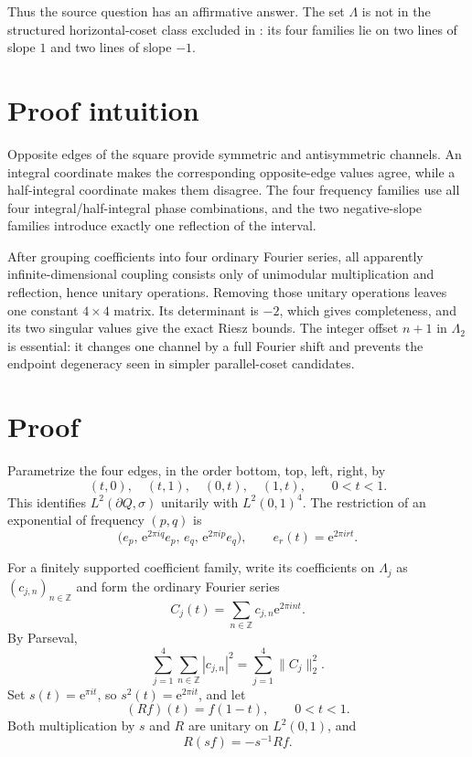 \documentclass[11pt]{article}
\newcommand{\Z}{\mathbb Z}
\newcommand{\e}{\mathrm e}
\begin{document}
Thus the source question has an affirmative answer.  The set $\Lambda$ is not
in the structured horizontal-coset class excluded in \cite{LaiSheynis}: its
four families lie on two lines of slope $1$ and two lines of slope $-1$.

\section{Proof intuition}

Opposite edges of the square provide symmetric and antisymmetric channels.
An integral coordinate makes the corresponding opposite-edge values agree,
while a half-integral coordinate makes them disagree.  The four frequency
families use all four integral/half-integral phase combinations, and the two
negative-slope families introduce exactly one reflection of the interval.

After grouping coefficients into four ordinary Fourier series, all apparently
infinite-dimensional coupling consists only of unimodular multiplication and
reflection, hence unitary operations.  Removing those unitary operations
leaves one constant $4\times4$ matrix.  Its determinant is $-2$, which gives
completeness, and its two singular values give the exact Riesz bounds.  The
integer offset $n+1$ in $\Lambda_2$ is essential: it changes one channel by a
full Fourier shift and prevents the endpoint degeneracy seen in simpler
parallel-coset candidates.

\section{Proof}

Parametrize the four edges, in the order bottom, top, left, right, by
\[
(t,0),\quad(t,1),\quad(0,t),\quad(1,t),\qquad 0<t<1.
\]
This identifies $L^2(\partial Q,\sigma)$ unitarily with $L^2(0,1)^4$.
The restriction of an exponential of frequency $(p,q)$ is
\begin{equation}\label{eq:restriction}
 \bigl(e_p,\,\e^{2\pi iq}e_p,\,e_q,\,
       \e^{2\pi ip}e_q\bigr),
 \qquad e_r(t)=\e^{2\pi i r t}.
\end{equation}

For a finitely supported coefficient family, write its coefficients on
$\Lambda_j$ as $(c_{j,n})_{n\in\Z}$ and form the ordinary Fourier series
\[
 C_j(t)=\sum_{n\in\Z}c_{j,n}\e^{2\pi int}.
\]
By Parseval,
\begin{equation}\label{eq:parseval}
 \sum_{j=1}^4\sum_{n\in\Z}|c_{j,n}|^2
       =\sum_{j=1}^4\|C_j\|_2^2.
\end{equation}
Set $s(t)=\e^{\pi it}$, so $s^2(t)=\e^{2\pi it}$, and let
\[
 (Rf)(t)=f(1-t),\qquad 0<t<1.
\]
Both multiplication by $s$ and $R$ are unitary on $L^2(0,1)$, and
\begin{equation}\label{eq:reflection}
                    R(sf)=-s^{-1}Rf.
\end{equation}
\end{document}
